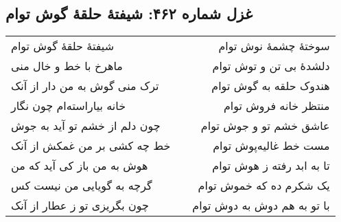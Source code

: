 \begin{center}
\section*{غزل شماره ۴۶۲: شیفتهٔ حلقهٔ گوش توام}
\label{sec:462}
\begin{longtable}{l p{0.5cm} r}
شیفتهٔ حلقهٔ گوش توام
&&
سوختهٔ چشمهٔ نوش توام
\\
ماهرخ با خط و خال منی
&&
دلشدهٔ بی تن و توش توام
\\
ترک منی گوش به من دار از آنک
&&
هندوک حلقه به گوش توام
\\
خانه بیاراسته‌ام چون نگار
&&
منتظر خانه فروش توام
\\
چون دلم از خشم تو آید به جوش
&&
عاشق خشم تو و جوش توام
\\
خط چه کشی بر من غمکش از آنک
&&
مست خط غالیه‌پوش توام
\\
هوش به من باز کی آید که من
&&
تا به ابد رفته ز هوش توام
\\
گرچه به گویایی من نیست کس
&&
یک شکرم ده که خموش توام
\\
چون بگریزی تو ز عطار از آنک
&&
با تو به هم دوش به دوش توام
\\
\end{longtable}
\end{center}
